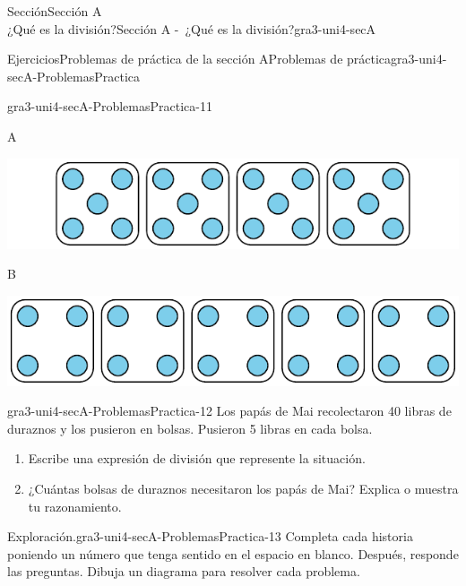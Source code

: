 \begin{sectionptx}{Sección}{{\Large Sección A\\}¿Qué es la división?}{}{Sección A -~¿Qué es la división?}{}{}{gra3-uni4-secA}
\begin{exercises-subsection}{Ejercicios}{Problemas de práctica de la sección A}{}{Problemas de práctica}{}{}{gra3-uni4-secA-ProblemasPractica}
\begin{divisionexercise}{9}{}{}{gra3-uni4-secA-ProblemasPractica-11}
\begin{enumerate}[label={(\alph*)}]
\begin{sidebyside}{2}{0}{0}{0}%
\begin{sbspanel}{0.07}%
A%
\end{sbspanel}%
\begin{sbspanel}{0.93}%
\includegraphics[max width=\linewidth, center]{external/svg-source/tikz-file-151671.pdf}
\end{sbspanel}%
\end{sidebyside}%
\begin{sidebyside}{2}{0}{0}{0}%
\begin{sbspanel}{0.07}%
B%
\end{sbspanel}%
\begin{sbspanel}{0.93}%
\includegraphics[max width=\linewidth, center]{external/svg-source/tikz-file-151672.pdf}
\end{sbspanel}%
\end{sidebyside}%
\end{enumerate}
%
\end{divisionexercise}%
\begin{divisionexercise}{10}{}{}{gra3-uni4-secA-ProblemasPractica-12}%
Los papás de Mai recolectaron 40 libras de duraznos y los pusieron en bolsas. Pusieron 5 libras en cada bolsa.%
\par
%
\begin{enumerate}[label={(\alph*)}]
\item{}Escribe una expresión de división que represente la situación.%
\item{}¿Cuántas bolsas de duraznos necesitaron los papás de Mai? Explica o muestra tu razonamiento.%
\end{enumerate}
%
\end{divisionexercise}%
\begin{divisionexercise}{11}{Exploración.}{}{gra3-uni4-secA-ProblemasPractica-13}%
Completa cada historia poniendo un número que tenga sentido en el espacio en blanco. Después, responde las preguntas. Dibuja un diagrama para resolver cada problema.%

\end{divisionexercise}
\end{exercises-subsection}
\end{sectionptx}
